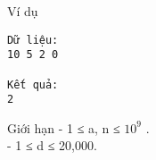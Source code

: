Ví dụ
\begin{verbatim}
Dữ liệu:
10 5 2 0

Kết quả:
2
\end{verbatim}
Giới hạn
- 1 ≤ a, n ≤ $10^{9}$   .   
\\   - 1 ≤ d ≤ 20,000.